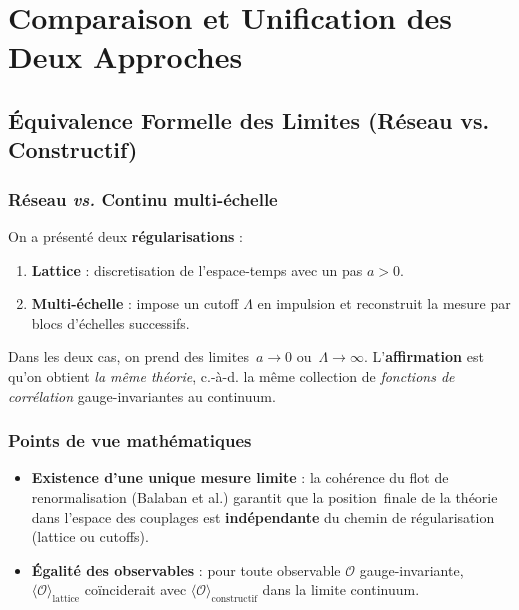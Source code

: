 \chapter{Comparaison et Unification des Deux Approches}
\label{chap:6}

\section{Équivalence Formelle des Limites (Réseau vs. Constructif)}
\label{sec:6.1}

\subsection*{Réseau \textit{vs.} Continu multi-échelle}
On a présenté deux \textbf{régularisations} :
\begin{enumerate}
	\item \textbf{Lattice} : discretisation de l’espace-temps avec un pas \(a>0\).  
	\item \textbf{Multi-échelle} : impose un cutoff \(\Lambda\) en impulsion et reconstruit la mesure par blocs d’échelles successifs.
\end{enumerate}
Dans les deux cas, on prend des limites \(\,a \to 0\) ou \(\,\Lambda \to \infty\). L’\textbf{affirmation} est qu’on obtient \emph{la même théorie}, c.-à-d. la même collection de \emph{fonctions de corrélation} gauge-invariantes au continuum.

\subsection*{Points de vue mathématiques}
\begin{itemize}
	\item \textbf{Existence d’une unique mesure limite} : la cohérence du flot de renormalisation (Balaban et al.) garantit que la \og position\fg\ finale de la théorie dans l’espace des couplages est \textbf{indépendante} du chemin de régularisation (lattice ou cutoffs).  
	\item \textbf{Égalité des observables} : pour toute observable \(\mathcal{O}\) gauge-invariante, \(\langle \mathcal{O}\rangle_{\mathrm{lattice}}\) coïnciderait avec \(\langle \mathcal{O}\rangle_{\mathrm{constructif}}\) dans la limite continuum.
\end{itemize}


